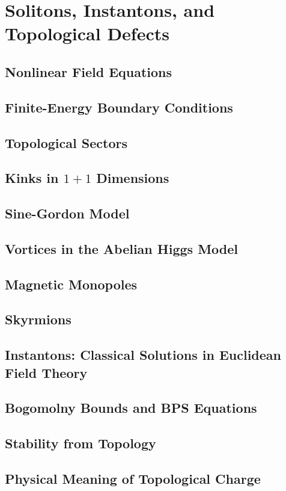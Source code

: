 \chapter{Solitons, Instantons, and Topological Defects}

\section{Nonlinear Field Equations}
\section{Finite-Energy Boundary Conditions}
\section{Topological Sectors}
\section{Kinks in \texorpdfstring{\(1+1\)}{1+1} Dimensions}
\section{Sine-Gordon Model}
\section{Vortices in the Abelian Higgs Model}
\section{Magnetic Monopoles}
\section{Skyrmions}
\section{Instantons: Classical Solutions in Euclidean Field Theory}
\section{Bogomolny Bounds and BPS Equations}
\section{Stability from Topology}
\section{Physical Meaning of Topological Charge}

